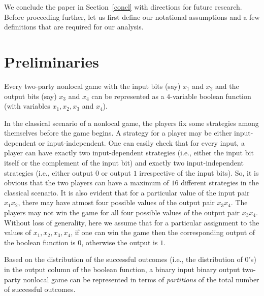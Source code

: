 \documentclass[]{svjour3}
\begin{document}
We conclude the paper in Section~\ref{concl} with directions for future research. Before proceeding further, let us first define our notational assumptions and a few definitions that are required for our analysis.

\section{Preliminaries}
\label{preli}
Every two-party nonlocal game with the input bits (say) $x_1$ and $x_2$ and the output bits (say) $x_3$ and $x_4$ can be represented as a $4$-variable boolean function (with variables $x_1, x_2, x_3$ and $x_4$). 

In the classical scenario of a nonlocal game, the players fix some strategies among themselves before the game begins. A strategy for a player may be either input-dependent or input-independent. One can easily check that for every input, a player can have exactly two input-dependent strategies (i.e., either the input bit itself or the complement of the input bit) and exactly two input-independent strategies (i.e., either output $0$ or output $1$ irrespective of the input bits). So, it is obvious that the two players can have a maximum of $16$ different strategies in the classical scenario. It is also evident that for a particular value of the input pair $x_1x_2$, there may have atmost four possible values of the output pair $x_3x_4$. The players may not win the game for all four possible values of the output pair $x_3x_4$. Without loss of generality, here we assume that for a particular assignment to the values of $x_1,x_2,x_3,x_4$, if one can win the game then the corresponding output of the boolean function is $0$, otherwise the output is $1$.

Based on the distribution of the successful outcomes (i.e., the distribution of $0'$s) in the output column of the boolean function, a binary input binary output two-party nonlocal game can be represented in terms of \emph{partitions} of the total number of successful outcomes.


\\
\end{document}
